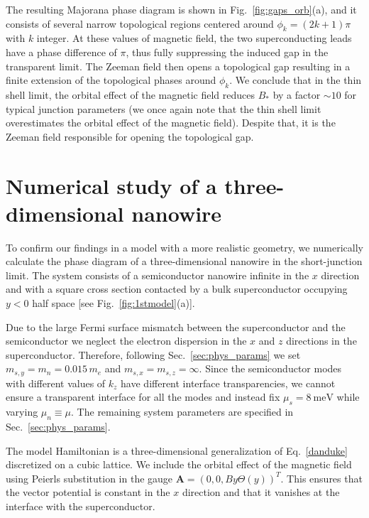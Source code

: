 \documentclass[twocolumn, notitlepage, 10pt, aps, floatfix, showpacs, prb, citeautoscript]{revtex4-1}
\newcommand{\comment}[1]{}
\begin{document}
The resulting Majorana phase diagram is shown in Fig.~\ref{fig:gaps_orb}(a), and it consists of several narrow topological regions centered around $\phi_k = (2k+1)\pi$ with $k$ integer.
At these values of magnetic field, the two superconducting leads have a phase difference of $\pi$, thus fully suppressing the induced gap in the transparent limit.
The Zeeman field then opens a topological gap resulting in a finite extension of the topological phases around $\phi_k$.
We conclude that in the thin shell limit, the orbital effect of the magnetic field reduces $B_*$ by a factor $\sim 10$ for typical junction parameters (we once again note that the thin shell limit overestimates the orbital effect of the magnetic field).
Despite that, it is the Zeeman field responsible for opening the topological gap.

\section{Numerical study of a three-dimensional nanowire}
\label{sec:3d}

\comment{As a final check we study 3D}
To confirm our findings in a model with a more realistic geometry, we numerically calculate the phase diagram of a three-dimensional nanowire in the short-junction limit.
The system consists of a semiconductor nanowire infinite in the $x$ direction and with a square cross section contacted by a bulk superconductor occupying $y<0$ half space  [see Fig.~\ref{fig:1stmodel}(a)].

Due to the large Fermi surface mismatch between the superconductor and the semiconductor we neglect the electron dispersion in the $x$ and $z$ directions in the superconductor.
Therefore, following Sec.~\ref{sec:phys_params} we set $m_{s,y} = m_n= 0.015\, m_e$ and $m_{s,x} = m_{s, z} = \infty$.
Since the semiconductor modes with different values of $k_z$ have different interface transparencies, we cannot ensure a transparent interface for all the modes and instead fix $\mu_s=\SI{8}{\meV}$ while varying $\mu_n\equiv\mu$.
The remaining system parameters are specified in Sec.~\ref{sec:phys_params}.

The model Hamiltonian is a three-dimensional generalization of Eq.~\eqref{danduke} discretized on a cubic lattice.
We include the orbital effect of the magnetic field using Peierls substitution in the gauge $\bm A={\left( 0, 0, B y\Theta(y) \right)}^{T}$.
This ensures that the vector potential is constant in the $x$ direction and that it vanishes at the interface with the superconductor.
\end{document}
